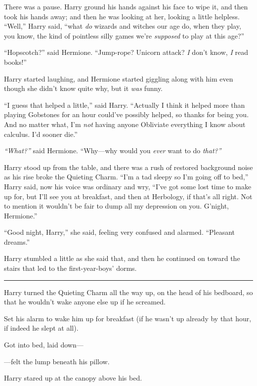 There was a pause. Harry ground his hands against his face to wipe it,
and then took his hands away; and then he was looking at her, looking a
little helpless. ``Well,'' Harry said, ``what \emph{do} wizards and
witches our age do, when they play, you know, the kind of pointless
silly games we're \emph{supposed} to play at this age?''

``Hopscotch?'' said Hermione. ``Jump-rope? Unicorn attack? \emph{I}
don't know, \emph{I} read books!''

Harry started laughing, and Hermione started giggling along with him
even though she didn't know quite why, but it \emph{was} funny.

``I guess that helped a little,'' said Harry. ``Actually I think it
helped more than playing Gobstones for an hour could've possibly helped,
so thanks for being you. And no matter what, I'm \emph{not} having
anyone Obliviate everything I know about calculus. I'd sooner die.''

\emph{``What?''} said Hermione. ``Why---why would you \emph{ever} want
to do \emph{that?''}

Harry stood up from the table, and there was a rush of restored
background noise as his rise broke the Quieting Charm. ``I'm a tad
sleepy so I'm going off to bed,'' Harry said, now his voice was ordinary
and wry, ``I've got some lost time to make up for, but I'll see you at
breakfast, and then at Herbology, if that's all right. Not to mention it
wouldn't be fair to dump all my depression on you. G'night, Hermione.''

``Good night, Harry,'' she said, feeling very confused and alarmed.
``Pleasant dreams.''

Harry stumbled a little as she said that, and then he continued on
toward the stairs that led to the first-year-boys' dorms.

\begin{center}\rule{3in}{0.4pt}\end{center}

Harry turned the Quieting Charm all the way up, on the head of his
bedboard, so that he wouldn't wake anyone else up if he screamed.

Set his alarm to wake him up for breakfast (if he wasn't up already by
that hour, if indeed he slept at all).

Got into bed, laid down---

---felt the lump beneath his pillow.

Harry stared up at the canopy above his bed.

